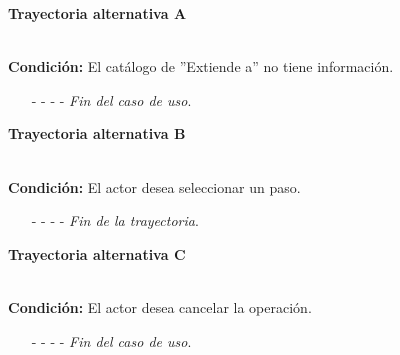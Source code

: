 \hypertarget{CU12-1-6-1:TAA}{\textbf{Trayectoria alternativa A}}\\
\noindent \textbf{Condición:} El catálogo de ''Extiende a'' no tiene información.
\begin{enumerate}
	\UCpaso[\UCsist] Muestra el mensaje  en la pantalla  para indicar que no existen casos de uso registrados.
	\item[- -] - - {\em {Fin del caso de uso}}.%
\end{enumerate}
\hypertarget{CU12-1-6-1:TAB}{\textbf{Trayectoria alternativa B}}\\
\noindent \textbf{Condición:} El actor desea seleccionar un paso.
\begin{enumerate}
	\UCpaso[\UCactor] Ingresa el token {\em P·}. 
	\UCpaso[\UCsist] Obtiene los pasos del caso de uso.
	\UCpaso[\UCsist] Muestra una lista con los pasos encontradas.
	\UCpaso[\UCactor] Selecciona un paso de la lista.
	\UCpaso[\UCsist] Verifica que el nombre del caso de uso al que pertenece el paso no contenga espacios. \hyperlink{CU12-1-6-1:TAI}{[Trayectoria I]}
	\UCpaso[\UCsist] Agrega la clave del caso de uso al que pertenece el paso al texto, seguido del signo ''·''. \label{CU12.1.6.1-TA6}
	\UCpaso[\UCsist] Agrega el número del caso de uso al texto, seguido del signo '':''.
	\UCpaso[\UCsist] Agrega el nombre del caso de uso al texto, seguido del signo '':''.
	\UCpaso[\UCsist] Agrega la clave de la trayectoria a la que pertenece el paso al texto, seguido del signo ''·''.
	\UCpaso[\UCsist] Agrega el número del paso seleccionado al texto.
	\UCpaso Continúa en el paso \ref{CU12.1.6.1-P6} de la trayectoria principal.
	\item[- -] - - {\em {Fin de la trayectoria}}.%
\end{enumerate}
\hypertarget{CU12-1-6-1:TAC}{\textbf{Trayectoria alternativa C}}\\
\noindent \textbf{Condición:} El actor desea cancelar la operación.
\begin{enumerate}
	\UCpaso[\UCactor] Solicita cancelar la operación oprimiendo el botón  de la pantalla .
	\UCpaso[\UCsist] Muestra la pantalla .
	\item[- -] - - {\em {Fin del caso de uso}}.%
\end{enumerate}
